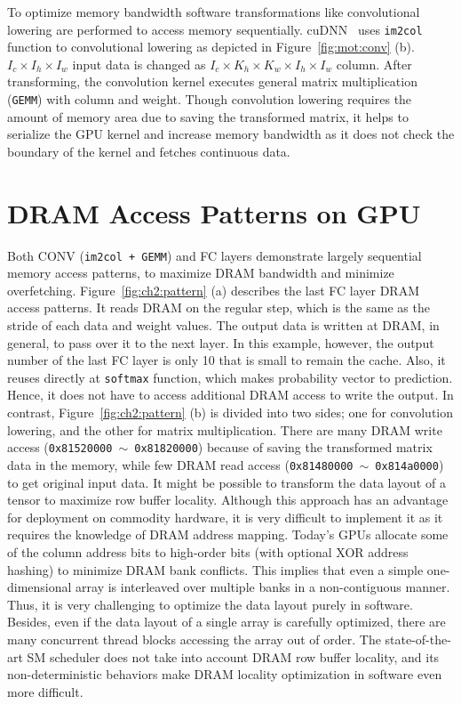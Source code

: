 To optimize memory bandwidth software transformations like convolutional lowering are performed to access memory sequentially.
cuDNN~ uses \texttt{im2col} function to convolutional lowering as depicted in Figure~\ref{fig:mot:conv} (b).
\texttt{$I_{c}\times I_{h}\times I_{w}$} input data is changed as \texttt{$I_{c}\times K_{h}\times K_{w}\times I_{h}\times I_{w}$} column.
After transforming, the convolution kernel executes general matrix multiplication (\texttt{GEMM}) with column and weight.
Though convolution lowering requires the amount of memory area due to saving the transformed matrix, it helps to serialize the GPU kernel and increase memory bandwidth as it does not check the boundary of the kernel and fetches continuous data.

\section{DRAM Access Patterns on GPU}
Both CONV (\texttt{im2col + GEMM}) and FC layers demonstrate largely sequential memory access patterns, to maximize DRAM bandwidth and minimize overfetching.
Figure~\ref{fig:ch2:pattern} (a) describes the last FC layer DRAM access patterns.
It reads DRAM on the regular step, which is the same as the stride of each data and weight values.
The output data is written at DRAM, in general, to pass over it to the next layer.
In this example, however, the output number of the last FC layer is only 10 that is small to remain the cache.
Also, it reuses directly at \texttt{softmax} function, which makes probability vector to prediction.
Hence, it does not have to access additional DRAM access to write the output.
In contrast, Figure~\ref{fig:ch2:pattern} (b) is divided into two sides; one for convolution lowering, and the other for matrix multiplication.
There are many DRAM write access (\texttt{0x81520000}~$\sim$~\texttt{0x81820000}) because of saving the transformed matrix data in the memory, while few DRAM read access (\texttt{0x81480000}~$\sim$~\texttt{0x814a0000}) to get original input data.
It might be possible to transform the data layout of a tensor to maximize row buffer locality. 
Although this approach has an advantage for deployment on commodity hardware, 
it is very difficult to implement it as it requires the knowledge of DRAM address mapping. 
Today's GPUs allocate some of the column address bits to high-order bits 
(with optional XOR address hashing) to minimize DRAM bank conflicts. 
This implies that even a simple one-dimensional array is interleaved over multiple banks 
in a non-contiguous manner. Thus, it is very challenging to optimize the data layout purely in software.
Besides, even if the data layout of a single array is carefully optimized, 
there are many concurrent thread blocks accessing the array out of order. 
The state-of-the-art SM scheduler does not take into account DRAM row buffer locality, and its 
non-deterministic behaviors make DRAM locality optimization in software even more difficult.

